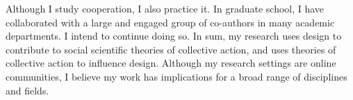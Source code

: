 \documentclass[10pt]{memoir}
\begin{document}
Although I study cooperation, I also practice it. In graduate school,
I have collaborated with a large and engaged group of co-authors in
many academic departments. I intend to continue doing so. In sum, my
research uses design to contribute to social scientific theories of
collective action, and uses theories of collective action to influence
design. Although my research settings are online communities, I
believe my work has implications for a broad range of disciplines and
fields.

\renewcommand{\bibsection}{\section{\bibname}\prebibhook}
\baselineskip 14.2pt


\end{document}
